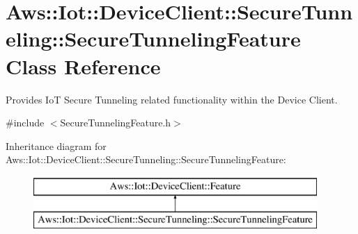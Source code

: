 \hypertarget{class_aws_1_1_iot_1_1_device_client_1_1_secure_tunneling_1_1_secure_tunneling_feature}{}\section{Aws\+:\+:Iot\+:\+:Device\+Client\+:\+:Secure\+Tunneling\+:\+:Secure\+Tunneling\+Feature Class Reference}
\label{class_aws_1_1_iot_1_1_device_client_1_1_secure_tunneling_1_1_secure_tunneling_feature}


Provides IoT Secure Tunneling related functionality within the Device Client.  




{\ttfamily \#include $<$Secure\+Tunneling\+Feature.\+h$>$}

Inheritance diagram for Aws\+:\+:Iot\+:\+:Device\+Client\+:\+:Secure\+Tunneling\+:\+:Secure\+Tunneling\+Feature\+:\begin{figure}[H]
\begin{center}
\leavevmode
\includegraphics[height=2.000000cm]{class_aws_1_1_iot_1_1_device_client_1_1_secure_tunneling_1_1_secure_tunneling_feature}
\end{center}
\end{figure}
